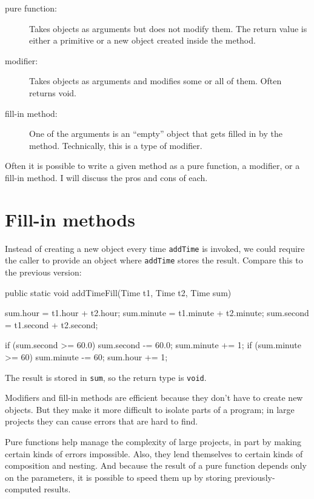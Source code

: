 \begin{description}

\item[pure function:]  Takes objects as
arguments but does not modify them.  The return value is
either a primitive or a new object created inside the method.

\item[modifier:]  Takes objects as arguments and modifies some
or all of them.  Often returns void. 

\item[fill-in method:]  One of the arguments is an ``empty''
object that gets filled in by the method.  Technically, this is
a type of modifier.

\end{description}

Often it is possible to write a given method as a pure function, a modifier,
or a fill-in method.  I will discuss the pros and cons of each.


\section{Fill-in methods}

Instead of creating a new object every time {\tt addTime} is invoked, we could require the caller to provide an object where {\tt addTime} stores the result.
Compare this to the previous version:

\begin{code}
public static void addTimeFill(Time t1, Time t2, Time sum) {
    sum.hour = t1.hour + t2.hour;
    sum.minute = t1.minute + t2.minute;
    sum.second = t1.second + t2.second;

    if (sum.second >= 60.0) {
        sum.second -= 60.0;
        sum.minute += 1;
    }
    if (sum.minute >= 60) {
        sum.minute -= 60;
        sum.hour += 1;
    }
}
\end{code}

The result is stored in {\tt sum}, so the return type is {\tt void}.

Modifiers and fill-in methods are efficient because they don't have to create new objects.
But they make it more difficult to isolate parts of a program; in large projects they can cause errors that are hard to find.

Pure functions help manage the complexity of large projects, in part by making certain kinds of errors impossible.
Also, they lend themselves to certain kinds of composition and nesting.
And because the result of a pure function depends only on the parameters, it is possible to speed them up by storing previously-computed results.

